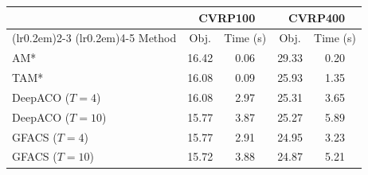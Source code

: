\begin{tabular}{lcccc}
\toprule[1.0pt]
\multicolumn{1}{c}{} & \multicolumn{2}{c}{CVRP100} & \multicolumn{2}{c}{CVRP400}\\
\cmidrule[0.5pt](lr{0.2em}){2-3}
\cmidrule[0.5pt](lr{0.2em}){4-5}
Method & Obj. & Time (s) & Obj. & Time (s)\\
\midrule
AM* & 16.42 & 0.06 & 29.33 & 0.20 \\
TAM* & 16.08 & 0.09 & 25.93 & 1.35 \\
\midrule
DeepACO ($T=4$) & 16.08 & 2.97 & 25.31 & 3.65 \\
DeepACO ($T=10$) & 15.77 & 3.87 & 25.27 & 5.89 \\
\midrule
GFACS ($T=4$) & 15.77 & 2.91 & 24.95 & 3.23 \\
GFACS ($T=10$) & 15.72 & 3.88 & 24.87 & 5.21 \\
\bottomrule

\end{tabular}